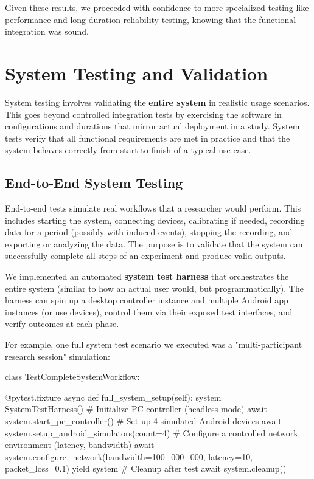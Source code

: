 Given these results, we proceeded with confidence to more specialized
testing like performance and long-duration reliability testing, knowing
that the functional integration was sound.

\section{System Testing and Validation}

System testing involves validating the \textbf{entire system} in realistic
usage scenarios. This goes beyond controlled integration tests by
exercising the software in configurations and durations that mirror
actual deployment in a study. System tests verify that all functional
requirements are met in practice and that the system behaves correctly
from start to finish of a typical use case.

\subsection{End-to-End System Testing}

End-to-end tests simulate real workflows that a researcher would
perform. This includes starting the system, connecting devices,
calibrating if needed, recording data for a period (possibly with
induced events), stopping the recording, and exporting or analyzing the
data. The purpose is to validate that the system can successfully
complete all steps of an experiment and produce valid outputs.

We implemented an automated \textbf{system test harness} that orchestrates
the entire system (similar to how an actual user would, but
programmatically). The harness can spin up a desktop controller instance
and multiple Android app instances (or use devices), control them via
their exposed test interfaces, and verify outcomes at each phase.

For example, one full system test scenario we executed was a
"multi-participant research session" simulation:

    class TestCompleteSystemWorkflow:

        @pytest.fixture
        async def full_system_setup(self):
            system = SystemTestHarness()
            # Initialize PC controller (headless mode)
            await system.start_pc_controller()
            # Set up 4 simulated Android devices
            await system.setup_android_simulators(count=4)
            # Configure a controlled network environment (latency, bandwidth)
            await system.configure_network(bandwidth=100_000_000, latency=10, packet_loss=0.1)
            yield system
            # Cleanup after test
            await system.cleanup()

